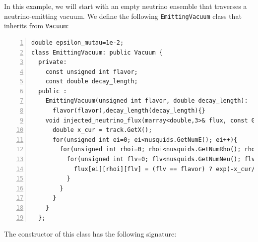 \documentclass[3p,12pt]{elsarticle}
\begin{document}
In this example, we will start with an empty neutrino ensemble that traverses a neutrino-emitting
vacuum. We define the following \texttt{EmittingVacuum} class that inherits from \texttt{Vacuum}:

\begin{lstlisting}[frame=leftline, numbers =
  left,breaklines=true,label = ex:sin1,firstnumber=last]
  double epsilon_mutau=1e-2;
class EmittingVacuum: public Vacuum {
  private:
    const unsigned int flavor;
    const double decay_length;
  public :
    EmittingVacuum(unsigned int flavor, double decay_length):
      flavor(flavor),decay_length(decay_length){}
    void injected_neutrino_flux(marray<double,3>& flux, const GenericTrack& track, const nuSQUIDS& nusquids) override {
      double x_cur = track.GetX();
      for(unsigned int ei=0; ei<nusquids.GetNumE(); ei++){
        for(unsigned int rhoi=0; rhoi<nusquids.GetNumRho(); rhoi++){
          for(unsigned int flv=0; flv<nusquids.GetNumNeu(); flv++){
            flux[ei][rhoi][flv] = (flv == flavor) ? exp(-x_cur/decay_length) : 0.0;
          }
        }
      }
    }
  };
\end{lstlisting}

The constructor of this class has the following signature:
\end{document}
